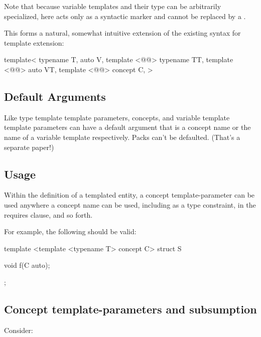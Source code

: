 \documentclass{wg21}
\begin{document}
Note that because variable templates and their type can be arbitrarily specialized,  here acts
only as a syntactic marker and cannot be replaced by a .

This forms a natural, somewhat intuitive extension of the existing syntax for template extension:
\begin{colorblock}
template<
    typename T,
    auto V,
    template <@@> typename TT,
    template <@@> auto VT,
    template <@@> concept C,
>
\end{colorblock}

\subsection{Default Arguments}

Like type template template parameters, concepts, and variable template template
parameters can have a default argument that is a concept name or the name of a variable template respectively.
Packs can't be defaulted. (That's a separate paper!)

\subsection{Usage}

Within the definition of a templated entity, a concept template-parameter
can be used anywhere a concept name can be used, including as a type constraint, in the requires clause, and so forth.

For example, the following should be valid:

\begin{colorblock}
template <template <typename T> concept C>
struct S {
    void f(C auto);

};
\end{colorblock}

\subsection{Concept template-parameters and subsumption}

Consider:
\end{document}
